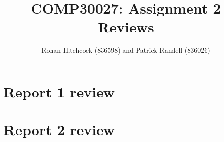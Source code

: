 \documentclass[11pt]{article}
\begin{document}
\title{\textbf{COMP30027: Assignment 2 Reviews}}
\author{Rohan Hitchcock (836598) and Patrick Randell (836026)}
\date{}
\maketitle

\section*{Report 1 review}

\section*{Report 2 review}
\end{document}
